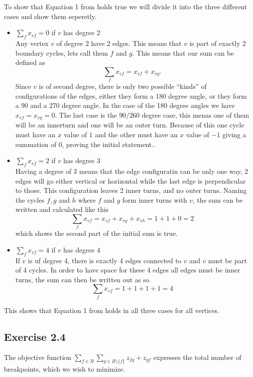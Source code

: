 To show that Equation 1 from \cite{assignment1} holds true we will divide it
into the three different cases and show them seperetly.
\begin{itemize}
\item $\sum_f x_{vf} = 0$ if $v$ has degree 2 \\
  Any vertex $v$ of degree 2 have 2 edges. This means that $v$ is part of
  exactly 2 boundary cycles, lets call them $f$ and $g$. This means that our sum
  can be defined as
  \[
    \sum_f x_{vf} = x_{vf} + x_{vg}.
  \]
  Since $v$ is of second degree, there is only two possible ``kinds'' of
  configurations of the edges, either they form a 180 degree angle, or they form
  a 90 and a 270 degree angle.  In the case of the 180 degree angles we have
  $x_{vf} = x_{vg} = 0$. The last case is the $90/260$ degree case, this menas
  one of them will be an innerturn and one will be an outer turn. Because of
  this one cycle must have an $x$ value of $1$ and the other must have an $x$
  value of $-1$ giving a summation of 0, proving the initial statement..
\item $\sum_f x_{vf} = 2$ if $v$ has degree 3 \\
  Having a degree of 3 means that the edge configuratin can be only one way, 2
  edges will go either vertical or horizontal while the last edge is
  perpendicular to those. This configuration leaves 2 inner turns, and no outer
  turns. Naming the cycles $f, g$ and $h$ where $f$ and $g$ form inner turns
  with $v$, the sum can be written and calculated like this
  \[
    \sum_f x_{vf} = x_{vf} + x_{vg} + x_{vh} = 1 + 1 + 0 = 2
  \]
  which shows the second part of the initial sum is true.

\item $\sum_f x_{vf} = 4$ if $v$ has degree 4 \\
  If $v$ is uf degree 4, there is exactly 4 edges connected to $v$ and $v$ must
  be part of 4 cycles. In order to have space for these 4 edges all edges must
  be inner turns, the sum can then be written out as so
  \[
    \sum_f x_{vf} = 1 + 1 + 1 + 1 = 4
  \]
\end{itemize}
%
This shows that Equation 1 from \cite{assignment1} holds in all three cases for
all vertices.
%
\subsection{Exercise 2.4}
%
The objective function $\sum_{f\in B} \sum_{g\in B\setminus\{f\}} z_{fg} +
z_{gf}$ expresses the total number of breakpoints, which we wish to minimize.

